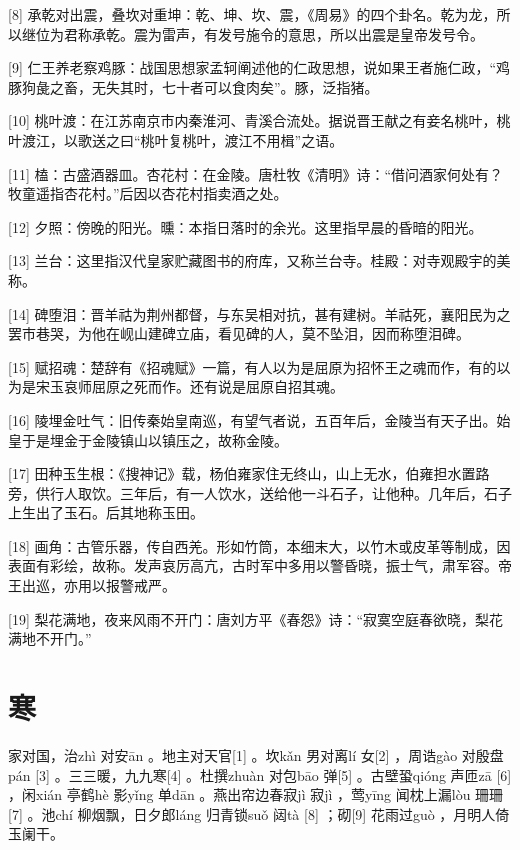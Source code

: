 \documentclass[12pt,UTF8]{ctexbook}
\begin{document}
[8] 承乾对出震，叠坎对重坤：乾、坤、坎、震，《周易》的四个卦名。乾为龙，所以继位为君称承乾。震为雷声，有发号施令的意思，所以出震是皇帝发号令。

[9] 仁王养老察鸡豚：战国思想家孟轲阐述他的仁政思想，说如果王者施仁政，“鸡豚狗彘之畜，无失其时，七十者可以食肉矣”。豚，泛指猪。

[10] 桃叶渡：在江苏南京市内秦淮河、青溪合流处。据说晋王献之有妾名桃叶，桃叶渡江，以歌送之曰“桃叶复桃叶，渡江不用楫”之语。

[11] 榼：古盛酒器皿。杏花村：在金陵。唐杜牧《清明》诗：“借问酒家何处有？牧童遥指杏花村。”后因以杏花村指卖酒之处。

[12] 夕照：傍晚的阳光。曛：本指日落时的余光。这里指早晨的昏暗的阳光。

[13] 兰台：这里指汉代皇家贮藏图书的府库，又称兰台寺。桂殿：对寺观殿宇的美称。

[14] 碑堕泪：晋羊祜为荆州都督，与东吴相对抗，甚有建树。羊祜死，襄阳民为之罢巿巷哭，为他在岘山建碑立庙，看见碑的人，莫不坠泪，因而称堕泪碑。

[15] 赋招魂：楚辞有《招魂赋》一篇，有人以为是屈原为招怀王之魂而作，有的以为是宋玉哀师屈原之死而作。还有说是屈原自招其魂。

[16] 陵埋金吐气：旧传秦始皇南巡，有望气者说，五百年后，金陵当有天子出。始皇于是埋金于金陵镇山以镇压之，故称金陵。

[17] 田种玉生根：《搜神记》载，杨伯雍家住无终山，山上无水，伯雍担水置路旁，供行人取饮。三年后，有一人饮水，送给他一斗石子，让他种。几年后，石子上生出了玉石。后其地称玉田。

[18] 画角：古管乐器，传自西羌。形如竹筒，本细末大，以竹木或皮革等制成，因表面有彩绘，故称。发声哀厉高亢，古时军中多用以警昏晓，振士气，肃军容。帝王出巡，亦用以报警戒严。

[19] 梨花满地，夜来风雨不开门：唐刘方平《春怨》诗：“寂寞空庭春欲晓，梨花满地不开门。”





\chapter{寒}


家对国，治zhì 对安ān 。地主对天官[1] 。坎kǎn 男对离lí 女[2] ，周诰gào 对殷盘pán [3] 。三三暖，九九寒[4] 。杜撰zhuàn 对包bāo 弹[5] 。古壁蛩qióng 声匝zā [6] ，闲xián 亭鹤hè 影yǐng 单dān 。燕出帘边春寂jì 寂jì ，莺yīng 闻枕上漏lòu 珊珊[7] 。池chí 柳烟飘，日夕郎láng 归青锁suǒ 闼tà [8] ；砌[9] 花雨过guò ，月明人倚玉阑干。
\end{document}
